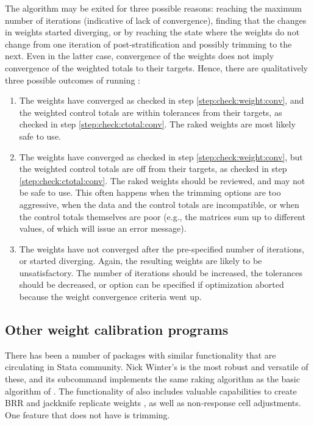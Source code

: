The algorithm may be exited for three possible reasons: reaching
the maximum number of iterations (indicative of lack of convergence),
finding that the changes in weights started diverging,
or by reaching the state where the weights do not change from one iteration
of post-stratification and possibly trimming to the next. Even in the latter
case, convergence of the weights does not imply convergence of the weighted
totals to their targets. Hence, there are qualitatively three possible
outcomes of running :
\begin{enumerate}
    \item The weights have converged as checked in step
         \ref{step:check:weight:conv}, and the weighted control totals
         are within tolerances from their targets, as checked in
         step \ref{step:check:ctotal:conv}. The raked weights
         are most likely safe to use.
    \item The weights have converged as checked in step
         \ref{step:check:weight:conv}, but the weighted control totals
         are off from their targets, as checked in
         step \ref{step:check:ctotal:conv}. The raked weights
         should be reviewed, and may not be safe to use.
         This often happens when the trimming options are
         too aggressive, when the data and the control totals
         are incompatible, or when the control totals themselves
         are poor (e.g., the matrices sum up to different values,
         of which  will issue an error message).
    \item The weights have not converged after the pre-specified number
        of iterations, or started diverging. Again, the resulting weights
        are likely to be unsatisfactory. The number of iterations should
        be increased, the tolerances should be decreased, or
         option can be specified if optimization aborted
        because the weight convergence criteria went up.
\end{enumerate}

\subsection{Other weight calibration programs}

There has been a number of packages with similar functionality
that are circulating in Stata community. Nick Winter's 
\citep{winter:2002}
is the most robust and versatile of these, and its 
subcommand implements the same raking algorithm as the basic algorithm
of . The functionality of  also includes
valuable capabilities to create BRR and jackknife replicate weights
\citep{kolenikov:2010}, as well as non-response cell adjustments.
One feature that  does not have is trimming.

